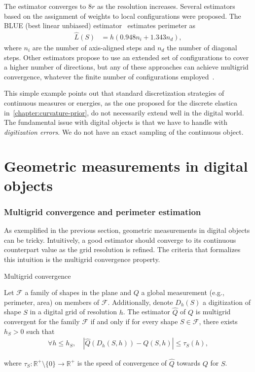 The estimator converges to $8r$ as the resolution increases. %
Several estimators based on the assignment of weights to local configurations were proposed. The BLUE (best linear unbiased) estimator~\cite{dorst87length} estimates perimeter as 
\begin{align*}
	\hat{L}(S) &= h( 0.948 n_i + 1.343 n_d),
\end{align*}
where $n_i$ are the number of axis-aligned steps and $n_d$ the number of diagonal steps. Other estimators propose to use an extended set of configurations to cover a higher number of directions, but any of these approaches can achieve multigrid convergence, whatever the finite number of configurations employed~\cite{tajine03local}.

This simple example points out that standard discretization strategies of continuous measures or energies, as the one proposed for the discrete elastica in~\cref{chapter:curvature-prior}, do not necessarily extend well in the digital world. The fundamental issue with digital objects is that we have to handle with \emph{digitization errors}. We do not have an exact sampling of the continuous object.

\section{Geometric measurements in digital objects}\label{ch5:sec:geometric-measurements}

\subsubsection{Multigrid convergence and perimeter estimation}

As exemplified in the previous section, geometric measurements in digital objects can be tricky. Intuitively, a good estimator should converge to its continuous counterpart value as the grid resolution is refined. The criteria that formalizes this intuition is the multigrid convergence property.

\begin{definition}{Multigrid convergence}

Let $\mathcal{F}$ a family of shapes in the plane and $Q$ a global measurement (e.g., perimeter, area) on members of $\mathcal{F}$. Additionally, denote $D_h(S)$ a digitization of shape $S$ in a digital grid of resolution $h$. The estimator $\hat{Q}$ of $Q$ is multigrid convergent for the family $\mathcal{F}$ if and only if for every shape $S \in \mathcal{F}$, there exists $h_S > 0$ such that
\begin{align*}
\forall h \leq h_S, \quad |\hat{Q}(D_h(S,h)) - Q(S,h)| \leq \tau_S(h),
\end{align*}

where $\tau_S:\mathbb{R}^+\setminus \{0\} \rightarrow \mathbb{R}^+$ is the speed of convergence of $\hat{Q}$ towards $Q$ for $S$.

\end{definition}

